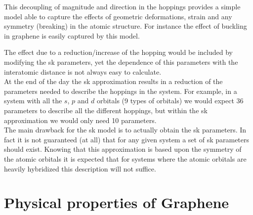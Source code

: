 This decoupling of magnitude and direction in the hoppings provides a simple model able to capture the effects of geometric deformations, strain and any symmetry (breaking) in the atomic structure. For instance the effect of buckling in graphene is easily captured by this model.

The effect due to a reduction/increase of the hopping would be included by modifying the \ac{sk} parameters, yet the dependence of this parameters with the interatomic distance is not always easy to calculate.\\

At the end of the day the \ac{sk} approximation results in a reduction of the parameters needed to describe the hoppings in the system. For example, in a system with all the $s$, $p$ and $d$ orbitals (9 types of orbitals) we would expect 36 parameters to describe all the different hoppings, but within the \ac{sk} approximation we would only need 10 parameters.\\


The main drawback for the \ac{sk} model is to actually obtain the \ac{sk} parameters. In fact it is not guaranteed (at all) that for any given system a set of \ac{sk} parameters should exist.
Knowing that this approximation is based upon the symmetry of the atomic orbitals it is expected that for systems where the atomic orbitals are heavily hybridized this description will not suffice.




\section{Physical properties of Graphene}
